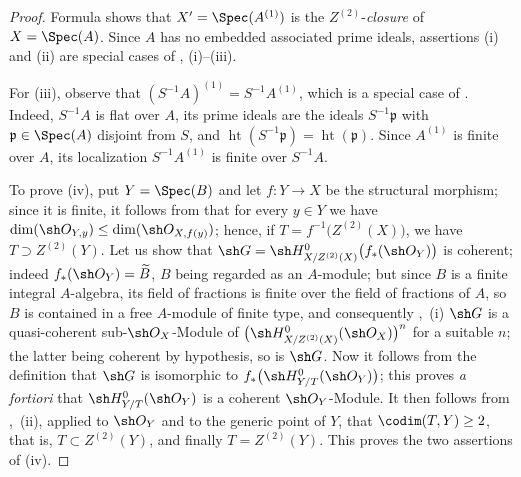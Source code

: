 \begin{proof}
Formula  shows that $X'=\Spec(A^{(1)})$
is the $Z^{(2)}$-\emph{closure} of $X=\Spec(A)$.  Since $A$ has no
embedded associated prime ideals, assertions {\rm(i)} and
{\rm(ii)} are special cases of ,
{\rm(i)--(iii)}.

For {\rm(iii)}, observe that $(S^{-1}A)^{(1)}=S^{-1}A^{(1)}$,
which is a special case of .  Indeed, $S^{-1}A$
is flat over $A$, its prime ideals are the ideals
$S^{-1}\mathfrak p$ with
$\mathfrak p\in\Spec(A)$ disjoint from $S$, and $\operatorname{ht}(S^{-1}\mathfrak p)
=\operatorname{ht}(\mathfrak p)$.
Since $A^{(1)}$ is finite over $A$, its localization
$S^{-1}A^{(1)}$ is finite over $S^{-1}A$.

To prove {\rm(iv)}, put $Y=\Spec(B)$ and let $f:Y\to X$ be the
structural morphism; since it is finite, it follows from 
that for every $y\in Y$ we have
$\dim(\sh O_{Y,y})\leq\dim(\sh O_{X,f(y)})$; hence, if
$T=f^{-1}\bigl(Z^{(2)}(X)\bigr)$, we have $T\supset Z^{(2)}(Y)$.  Let us
show that $\sh G=\sh H^0_{X/Z^{(2)}(X)}\bigl(f_*(\sh O_Y)\bigr)$
is coherent; indeed $f_*(\sh O_Y)=\widetilde B$, $B$ being regarded as
an $A$-module; but since $B$ is a finite integral $A$-algebra, its field
of fractions is finite over the field of fractions of $A$, so $B$ is
contained in a free $A$-module of finite type, and consequently
,~{\rm(i)} $\sh G$ is a quasi-coherent
sub-$\sh O_X$-Module of $\bigl(\sh H^0_{X/Z^{(2)}(X)}(\sh O_X)\bigr)^n$
for a suitable $n$; the latter being coherent by hypothesis, so is
$\sh G$.  Now it follows from the definition  that
$\sh G$ is isomorphic to $f_*\bigl(\sh H^0_{Y/T}(\sh O_Y)\bigr)$; this
proves \emph{a fortiori} that $\sh H^0_{Y/T}(\sh O_Y)$ is a coherent
$\sh O_Y$-Module.  It then follows from ,~{\rm(ii)},
applied to $\sh O_Y$ and to the generic point of $Y$, that
$\codim(T,Y)\geq2$, that is, $T\subset Z^{(2)}(Y)$, and finally
$T=Z^{(2)}(Y)$.  This proves the two assertions of {\rm(iv)}.
\end{proof}
